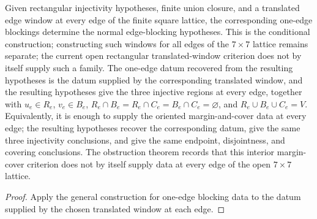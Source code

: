 \begin{theorem}%
    \label{thm:peps_normalSquareTranslatedEdgeBlockingHypotheses_of_windows}
    \leanok
    Given rectangular injectivity hypotheses, finite union closure, and a
    translated edge window at every edge of the finite square lattice, the
    corresponding one-edge blockings determine the normal edge-blocking
    hypotheses. This is the conditional construction;
    constructing such windows for all edges of the $7\times7$ lattice remains
    separate; the current open rectangular translated-window criterion does not
    by itself supply such a family. The one-edge datum recovered from the
    resulting hypotheses is the datum supplied by the corresponding translated
    window, and the resulting hypotheses give the three injective regions at
    every edge, together with
    $u_e\in R_e$, $v_e\in B_e$,
    $R_e\cap B_e=R_e\cap C_e=B_e\cap C_e=\varnothing$, and
    $R_e\cup B_e\cup C_e=V$. Equivalently, it is enough to supply the oriented
    margin-and-cover data at every edge; the resulting hypotheses recover the
    corresponding datum, give the same three injectivity conclusions, and give
    the same endpoint, disjointness, and covering conclusions. The obstruction
    theorem records that this interior margin-cover criterion does not by
    itself supply data at every edge of the open $7\times7$ lattice.
\end{theorem}
\begin{proof}\leanok
    Apply the general construction for one-edge blocking data to the datum
    supplied by the chosen translated window at each edge.
\end{proof}

